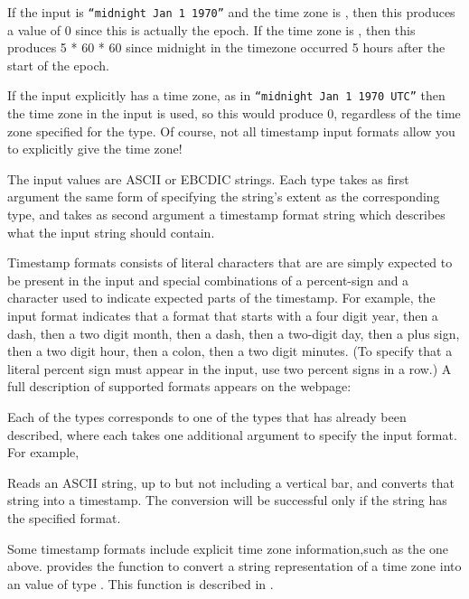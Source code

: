 If the input is \texttt{``midnight Jan 1 1970''} and the time zone is , then
this produces a value of 0 since this is actually the epoch.  If the
time zone is , then this produces 5 * 60 * 60 since midnight in the
 timezone occurred 5 hours after the start of the epoch.

If  the input explicitly has a time zone, as in \texttt{``midnight Jan 1 1970
UTC''} then the time zone in the input is used, so this would produce 0,
regardless of the time zone specified for the type.  Of course, not
all timestamp input formats allow you to explicitly give the time
zone!


The input values are ASCII or EBCDIC strings.  Each
 type takes as first argument the same form of
specifying the string's extent as the corresponding  type, and
takes as second argument a timestamp format string which describes
what the input string should contain.

Timestamp formats consists of literal characters that are are simply
expected to be present in the input and special combinations of a
percent-sign and a character used to indicate expected parts of the
timestamp.  For example, the input format
indicates that a format that starts with a 
four digit year, then a dash, then a two digit month, then a dash,
then a two-digit day, then a plus sign, then a two digit hour, then a
colon, then a two digit minutes.  (To specify that a literal percent
sign must appear in the input, use two percent signs in a row.)  A
full description of supported formats appears on the webpage:


Each of the  types corresponds to one of the 
types that has already been described, where each takes one additional argument
to specify the input format.  For example,

%
\noindent
Reads an ASCII string, up to but not including a vertical bar, and
converts that string into a  timestamp.  The conversion will be
successful only if the string has the specified format.

Some timestamp formats include explicit time zone information,such as
the one above.  \pads{} provides the function  to convert a
string representation of a time zone into an value of type
.  This function is described in .

